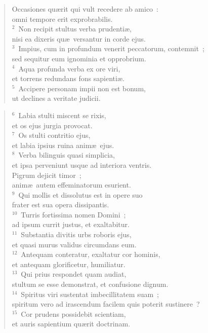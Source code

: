 \begin{flushleft}\begin{verse}\vspace{-19pt}\hspace{6pt}Occasiones qu\ae rit qui vult recedere ab amico~:\\\hspace{6pt} omni tempore erit exprobrabilis.\\
${}^{2}$~Non recipit stultus verba prudenti\ae ,\\ nisi ea dixeris qu\ae\ versantur in corde ejus.\\
${}^{3}$~Impius, cum in profundum venerit peccatorum, contemnit~;\\ sed sequitur eum ignominia et opprobrium.\\
${}^{4}$~Aqua profunda verba ex ore viri,\\ et torrens redundans fons sapienti\ae .\\
${}^{5}$~Accipere personam impii non est bonum,\\ ut declines a veritate judicii.\end{verse}\end{flushleft}


\begin{flushleft}\begin{verse}${}^{6}$~Labia stulti miscent se rixis,\\ et os ejus jurgia provocat.\\
${}^{7}$~Os stulti contritio ejus,\\ et labia ipsius ruina anim\ae\ ejus.\\
${}^{8}$~Verba bilinguis quasi simplicia,\\ et ipsa perveniunt usque ad interiora ventris.\\ Pigrum dejicit timor~;\\ anim\ae\ autem effeminatorum esurient.\\
${}^{9}$~Qui mollis et dissolutus est in opere suo\\ frater est sua opera dissipantis.\\
${}^{10}$~Turris fortissima nomen Domini~;\\ ad ipsum currit justus, et exaltabitur.\\
${}^{11}$~Substantia divitis urbs roboris ejus,\\ et quasi murus validus circumdans eum.\\
${}^{12}$~Antequam conteratur, exaltatur cor hominis,\\ et antequam glorificetur, humiliatur.\\
${}^{13}$~Qui prius respondet quam audiat,\\ stultum se esse demonstrat, et confusione dignum.\\
${}^{14}$~Spiritus viri sustentat imbecillitatem suam~;\\ spiritum vero ad irascendum facilem quis poterit sustinere~?\\
${}^{15}$~Cor prudens possidebit scientiam,\\ et auris sapientium qu\ae rit doctrinam.\end{verse}\end{flushleft}


